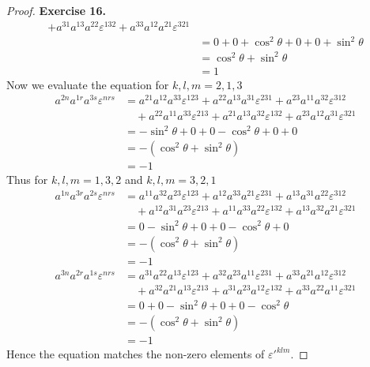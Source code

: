 \documentclass[11pt]{article}
\theoremstyle{definition}
\begin{document}
\begin{proof}{\textbf{Exercise 16.}}
\begin{align*}
        + a^{31}a^{13}a^{22}\varepsilon^{132}
        + a^{33}a^{12}a^{21}\varepsilon^{321}\\
        &= 0 + 0 + \cos^2\theta + 0 + 0 + \sin^2\theta\\
        &= \cos^2\theta + \sin^2\theta\\
        &= 1
    \end{align*}
    Now we evaluate the equation for $k,l,m = 2,1,3$
    \begin{align*}
        a^{2n}a^{1r}a^{3s}\varepsilon^{nrs} &=
        a^{21}a^{12}a^{33}\varepsilon^{123}
        + a^{22}a^{13}a^{31}\varepsilon^{231}
        + a^{23}a^{11}a^{32}\varepsilon^{312}\\
        &\quad+ a^{22}a^{11}a^{33}\varepsilon^{213}
        + a^{21}a^{13}a^{32}\varepsilon^{132}
        + a^{23}a^{12}a^{31}\varepsilon^{321}\\
        &= -\sin^2\theta + 0 + 0 -\cos^2\theta + 0 + 0\\
        &= -(\cos^2\theta + \sin^2\theta)\\
        &= -1
    \end{align*}
    Thus for $k,l,m = 1,3,2$ and $k,l,m = 3,2,1$
    \begin{align*}
        a^{1n}a^{3r}a^{2s}\varepsilon^{nrs} &=
        a^{11}a^{32}a^{23}\varepsilon^{123}
        + a^{12}a^{33}a^{21}\varepsilon^{231}
        + a^{13}a^{31}a^{22}\varepsilon^{312}\\
        &\quad+ a^{12}a^{31}a^{23}\varepsilon^{213}
        + a^{11}a^{33}a^{22}\varepsilon^{132}
        + a^{13}a^{32}a^{21}\varepsilon^{321}\\
        &= 0 -\sin^2\theta + 0 + 0 -\cos^2\theta + 0\\
        &= -(\cos^2\theta + \sin^2\theta)\\
        &= -1\\
        a^{3n}a^{2r}a^{1s}\varepsilon^{nrs} &=
        a^{31}a^{22}a^{13}\varepsilon^{123}
        + a^{32}a^{23}a^{11}\varepsilon^{231}
        + a^{33}a^{21}a^{12}\varepsilon^{312}\\
        &\quad+ a^{32}a^{21}a^{13}\varepsilon^{213}
        + a^{31}a^{23}a^{12}\varepsilon^{132}
        + a^{33}a^{22}a^{11}\varepsilon^{321}\\
        &= 0 + 0 -\sin^2\theta + 0 + 0 -\cos^2\theta\\
        &= -(\cos^2\theta + \sin^2\theta)\\
        &= -1
    \end{align*}
    Hence the equation matches the non-zero elements of $\varepsilon'^{klm}$.


\end{proof}
\end{document}

